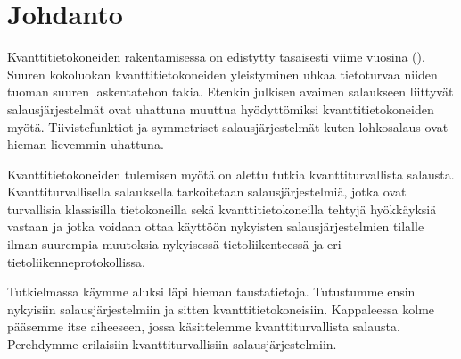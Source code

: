 \chapter{Johdanto\label{intro}}
Kvanttitietokoneiden rakentamisessa on edistytty tasaisesti viime vuosina (\cite{alagic2020status}). Suuren kokoluokan kvanttitietokoneiden yleistyminen uhkaa tietoturvaa niiden tuoman suuren laskentatehon takia. Etenkin julkisen avaimen salaukseen liittyvät salausjärjestelmät ovat uhattuna muuttua hyödyttömiksi kvanttitietokoneiden myötä. Tiivistefunktiot ja symmetriset salausjärjestelmät kuten lohkosalaus ovat hieman lievemmin uhattuna.

Kvanttitietokoneiden tulemisen myötä on alettu tutkia kvanttiturvallista salausta. Kvanttiturvallisella salauksella tarkoitetaan salausjärjestelmiä, jotka ovat turvallisia klassisilla tietokoneilla sekä kvanttitietokoneilla tehtyjä hyökkäyksiä vastaan ja jotka voidaan ottaa käyttöön nykyisten salausjärjestelmien tilalle ilman suurempia muutoksia nykyisessä tietoliikenteessä ja eri tietoliikenneprotokollissa.

Tutkielmassa käymme aluksi läpi hieman taustatietoja. Tutustumme ensin nykyisiin salausjärjestelmiin ja sitten kvanttitietokoneisiin. Kappaleessa kolme pääsemme itse aiheeseen, jossa käsittelemme kvanttiturvallista salausta. Perehdymme erilaisiin kvanttiturvallisiin salausjärjestelmiin.